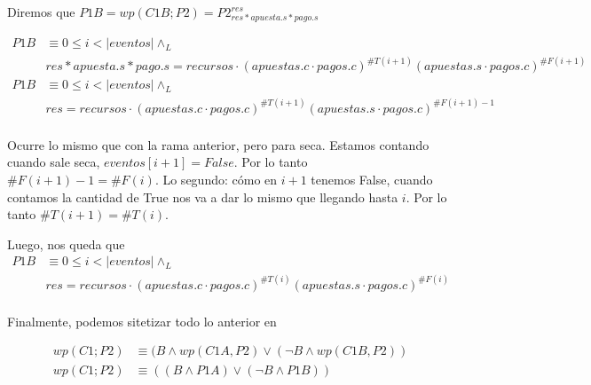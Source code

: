 \documentclass[../document.tex]{subfiles}
\begin{document}
Diremos que $P1B = wp(C1B;P2) = P2^{res}_{res * apuesta.s * pago.s}$

\begin{equation*} \label{eq2.b}
\begin{split}
P1B & \equiv 0\leq i < |eventos| \land_L \\& res * apuesta.s * pago.s = recursos \cdot (apuestas.c\cdot pagos.c)^{\#T(i+1)}(apuestas.s\cdot pagos.c)^{\#F(i+1)}\\
P1B & \equiv 0\leq i < |eventos| \land_L \\& res = recursos \cdot (apuestas.c\cdot pagos.c)^{\#T(i+1)}(apuestas.s\cdot pagos.c)^{\#F(i+1)-1}\\
\end{split}
\end{equation*}

Ocurre lo mismo que con la rama anterior, pero para seca.
Estamos contando cuando sale seca, $eventos[i+1] = False$. Por lo tanto $\#F(i+1)-1=\#F(i)$. Lo segundo: cómo en $i+1$ tenemos False, cuando contamos la cantidad de True nos va a dar lo mismo que llegando hasta $i$. Por lo tanto $\#T(i+1)=\#T(i)$.

Luego, nos queda que
\begin{equation*}
    \begin{split}
    P1B & \equiv 0\leq i < |eventos| \land_L \\& res = recursos \cdot (apuestas.c\cdot pagos.c)^{\#T(i)}(apuestas.s\cdot pagos.c)^{\#F(i)}\\
    \end{split}
\end{equation*}

Finalmente, podemos sitetizar todo lo anterior en

\begin{equation*} \label{final}
\begin{split}
    wp(C1;P2) &\equiv (B \land wp(C1A, P2) \lor (\neg B \land wp(C1B, P2))\\
    wp(C1;P2) &\equiv ((B \land P1A) \lor (\neg B \land P1B))\\
\end{split}
\end{equation*}

\end{document}
